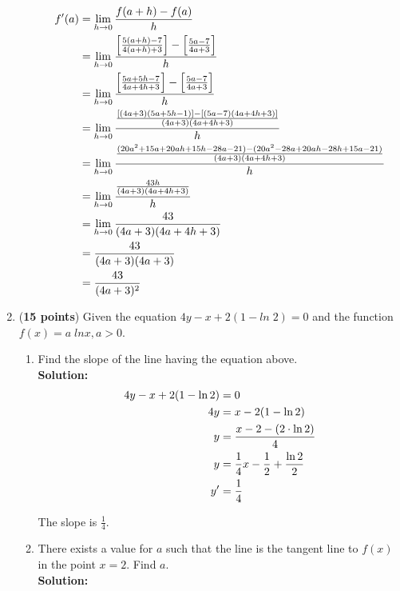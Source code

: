 \documentclass[a4paper]{article}
\begin{document}
\begin{enumerate}
\begin{enumerate}
\begin{align}
	f'(a) &= \lim_{h \to 0} \frac{f(a + h) - f(a)}{h}\notag\\
		&= \lim_{h \to 0} \frac{ \left[ \frac{5(a+h) - 7}{4(a+h) + 3 } \right] - \left[ \frac{5a - 7}{4a + 3} \right]}{h}\notag\\
		&= \lim_{h \to 0} \frac{ \left[ \frac{5a + 5h - 7}{4a + 4h + 3 } \right] - \left[ \frac{5a - 7}{4a + 3} \right]}{h}\notag\\
		&= \lim_{h \to 0} \frac{\frac{[(4a+3)(5a+5h-1)]-[(5a-7)(4a+4h+3)]}{(4a + 3)(4a+4h+3)}}{h}\notag\\
		&= \lim_{h \to 0} \frac{\frac{(20a^2+15a+20ah+15h-28a-21)-(20a^2-28a+20ah-28h+15a-21)}{(4a+3)(4a+4h+3)}}{h}\notag\\
		&= \lim_{h \to 0} \frac{\frac{43h}{(4a+3)(4a+4h+3)}}{h}\notag\\
		&= \lim_{h \to 0} \frac{43}{(4a+3)(4a+4h+3)}\notag\\
		&= \frac{43}{(4a+3)(4a+3)}\notag\\
		&= \frac{43}{(4a+3)^2}\notag
		\end{align}		
	
	
	
\end{enumerate}


\item (\textbf{15 points}) Given the equation $4y - x + 2(1 - ln\; 2) = 0$ and the function $f(x) = a \; ln x, a > 0$.\\


\begin{enumerate}
	\item Find the slope of the line having the equation above.\\
	\textbf{Solution:}\\
	
\begin{align*}
	4y - x + 2(1 - \ln 2) &= 0\notag\\
	4y &= x - 2(1 - \ln 2)\notag\\
	y &= \frac{x - 2 - (2 \cdot \ln 2)}{4}\notag\\
	y &= \frac{1}{4}x - \frac{1}{2} + \frac{\ln 2}{2}\notag\\
	y' &= \frac{1}{4}\notag
\end{align*}	

The slope is $\frac{1}{4}$.\\	
	
	
	\item There exists a value for $a$ such that the line is the tangent line to $f(x)$ in the point $x = 2$. Find $a$.\\
	\textbf{Solution:}\\
	

\end{enumerate}
\end{enumerate}
\end{document}
